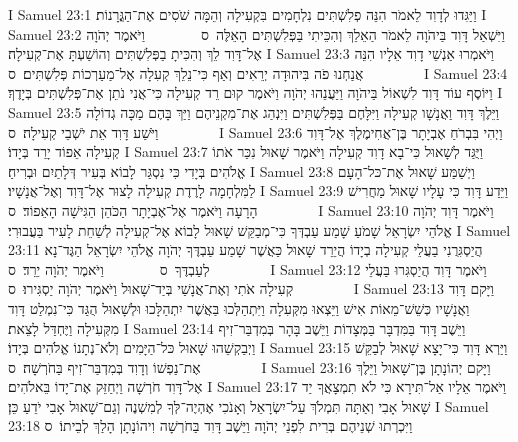 I Samuel 23:1	וַיַּגִּדוּ לְדָוִד לֵאמֹר הִנֵּה פְלִשְׁתִּים נִלְחָמִים בִּקְעִילָה וְהֵמָּה שֹׁסִים אֶת־הַגֳּרָנוֹת׃
I Samuel 23:2	וַיִּשְׁאַל דָּוִד בַּיהֹוָה לֵאמֹר הַאֵלֵךְ וְהִכֵּיתִי בַּפְּלִשְׁתִּים הָאֵלֶּה {ס}        וַיֹּאמֶר יְהֹוָה אֶל־דָּוִד לֵךְ וְהִכִּיתָ בַפְּלִשְׁתִּים וְהוֹשַׁעְתָּ אֶת־קְעִילָה׃
I Samuel 23:3	וַיֹּאמְרוּ אַנְשֵׁי דָוִד אֵלָיו הִנֵּה אֲנַחְנוּ פֹה בִּיהוּדָה יְרֵאִים וְאַף כִּי־נֵלֵךְ קְעִלָה אֶל־מַעַרְכוֹת פְּלִשְׁתִּים׃ {ס}        
I Samuel 23:4	וַיּוֹסֶף עוֹד דָּוִד לִשְׁאוֹל בַּיהֹוָה וַיַּעֲנֵהוּ יְהֹוָה וַיֹּאמֶר קוּם רֵד קְעִילָה כִּי־אֲנִי נֹתֵן אֶת־פְּלִשְׁתִּים בְּיָדֶךָ׃
I Samuel 23:5	וַיֵּלֶךְ דָּוִד וַאֲנָשָׁו קְעִילָה וַיִּלָּחֶם בַּפְּלִשְׁתִּים וַיִּנְהַג אֶת־מִקְנֵיהֶם וַיַּךְ בָּהֶם מַכָּה גְדוֹלָה וַיֹּשַׁע דָּוִד אֵת יֹשְׁבֵי קְעִילָה׃ {ס}        
I Samuel 23:6	וַיְהִי בִּבְרֹחַ אֶבְיָתָר בֶּן־אֲחִימֶלֶךְ אֶל־דָּוִד קְעִילָה אֵפוֹד יָרַד בְּיָדוֹ׃
I Samuel 23:7	וַיֻּגַּד לְשָׁאוּל כִּי־בָא דָוִד קְעִילָה וַיֹּאמֶר שָׁאוּל נִכַּר אֹתוֹ אֱלֹהִים בְּיָדִי כִּי נִסְגַּר לָבוֹא בְּעִיר דְּלָתַיִם וּבְרִיחַ׃
I Samuel 23:8	וַיְשַׁמַּע שָׁאוּל אֶת־כּל־הָעָם לַמִּלְחָמָה לָרֶדֶת קְעִילָה לָצוּר אֶל־דָּוִד וְאֶל־אֲנָשָׁיו׃
I Samuel 23:9	וַיֵּדַע דָּוִד כִּי עָלָיו שָׁאוּל מַחֲרִישׁ הָרָעָה וַיֹּאמֶר אֶל־אֶבְיָתָר הַכֹּהֵן הַגִּישָׁה הָאֵפוֹד׃ {ס}        
I Samuel 23:10	וַיֹּאמֶר דָּוִד יְהֹוָה אֱלֹהֵי יִשְׂרָאֵל שָׁמֹעַ שָׁמַע עַבְדְּךָ כִּי־מְבַקֵּשׁ שָׁאוּל לָבוֹא אֶל־קְעִילָה לְשַׁחֵת לָעִיר בַּעֲבוּרִי׃
I Samuel 23:11	הֲיַסְגִּרֻנִי בַעֲלֵי קְעִילָה בְיָדוֹ הֲיֵרֵד שָׁאוּל כַּאֲשֶׁר שָׁמַע עַבְדֶּךָ יְהֹוָה אֱלֹהֵי יִשְׂרָאֵל הַגֶּד־נָא לְעַבְדֶּךָ {ס}        וַיֹּאמֶר יְהֹוָה יֵרֵד׃ {ס}        
I Samuel 23:12	וַיֹּאמֶר דָּוִד הֲיַסְגִּרוּ בַּעֲלֵי קְעִילָה אֹתִי וְאֶת־אֲנָשַׁי בְּיַד־שָׁאוּל וַיֹּאמֶר יְהֹוָה יַסְגִּירוּ׃ {ס}        
I Samuel 23:13	וַיָּקם דָּוִד וַאֲנָשָׁיו כְּשֵׁשׁ־מֵאוֹת אִישׁ וַיֵּצְאוּ מִקְּעִלָה וַיִּתְהַלְּכוּ בַּאֲשֶׁר יִתְהַלָּכוּ וּלְשָׁאוּל הֻגַּד כִּי־נִמְלַט דָּוִד מִקְּעִילָה וַיֶּחְדַּל לָצֵאת׃
I Samuel 23:14	וַיֵּשֶׁב דָּוִד בַּמִּדְבָּר בַּמְּצָדוֹת וַיֵּשֶׁב בָּהָר בְּמִדְבַּר־זִיף וַיְבַקְשֵׁהוּ שָׁאוּל כּל־הַיָּמִים וְלֹא־נְתָנוֹ אֱלֹהִים בְּיָדוֹ׃
I Samuel 23:15	וַיַּרְא דָּוִד כִּי־יָצָא שָׁאוּל לְבַקֵּשׁ אֶת־נַפְשׁוֹ וְדָוִד בְּמִדְבַּר־זִיף בַּחֹרְשָׁה׃ {ס}        
I Samuel 23:16	וַיָּקם יְהוֹנָתָן בֶּן־שָׁאוּל וַיֵּלֶךְ אֶל־דָּוִד חֹרְשָׁה וַיְחַזֵּק אֶת־יָדוֹ בֵּאלֹהִים׃
I Samuel 23:17	וַיֹּאמֶר אֵלָיו אַל־תִּירָא כִּי לֹא תִמְצָאֲךָ יַד שָׁאוּל אָבִי וְאַתָּה תִּמְלֹךְ עַל־יִשְׂרָאֵל וְאָנֹכִי אֶהְיֶה־לְּךָ לְמִשְׁנֶה וְגַם־שָׁאוּל אָבִי יֹדֵעַ כֵּן׃
I Samuel 23:18	וַיִּכְרְתוּ שְׁנֵיהֶם בְּרִית לִפְנֵי יְהֹוָה וַיֵּשֶׁב דָּוִד בַּחֹרְשָׁה וִיהוֹנָתָן הָלַךְ לְבֵיתוֹ׃ {ס}        
